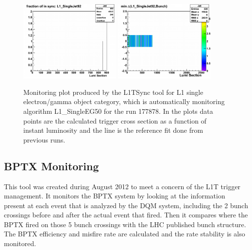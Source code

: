 \begin{figure}[!htb]
\centering
\includegraphics[width=0.45\textwidth]{Chapter03/L1TOnline/Images/Run177878_Jet_SynchronizationCertification.png}
\includegraphics[width=0.45\textwidth]{Chapter03/L1TOnline/Images/Run177878_Jet_SynchronizationTest.png}
\caption{Monitoring plot produced by the L1TSync tool for L1 single electron/gamma object category, which is
automatically monitoring algorithm L1\_SingleEG50 for the run 177878. In the plots data points are the calculated
trigger cross section as a function of instant luminosity and the line is the reference fit done from previous runs.}
\label{figure_ServiceWork_L1TSync}
\end{figure}

\subsection{BPTX Monitoring}

This tool was created during August 2012 to meet a concern of the \gls{L1T} trigger management. It monitors the \gls{BPTX} system by looking at the information present at each event that 
is analyzed by the \gls{DQM} system, including the 2 bunch crossings before and after the actual event that fired. Then it 
compares where the \gls{BPTX} fired on those 5 bunch crossings with the LHC published bunch structure. The \gls{BPTX} efficiency 
and misfire rate are calculated and the rate stability is also monitored.

